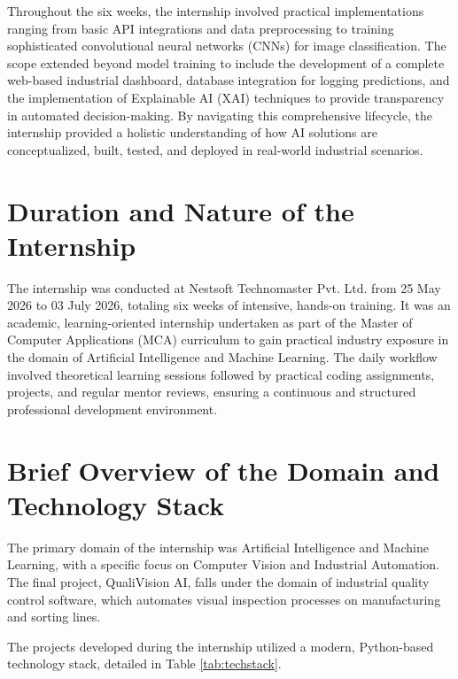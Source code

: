 Throughout the six weeks, the internship involved practical implementations ranging from basic API integrations and data preprocessing to training sophisticated convolutional neural networks (CNNs) for image classification. The scope extended beyond model training to include the development of a complete web-based industrial dashboard, database integration for logging predictions, and the implementation of Explainable AI (XAI) techniques to provide transparency in automated decision-making. By navigating this comprehensive lifecycle, the internship provided a holistic understanding of how AI solutions are conceptualized, built, tested, and deployed in real-world industrial scenarios.

\section{Duration and Nature of the Internship}

The internship was conducted at Nestsoft Technomaster Pvt. Ltd. from 25 May 2026 to 03 July 2026, totaling six weeks of intensive, hands-on training. It was an academic, learning-oriented internship undertaken as part of the Master of Computer Applications (MCA) curriculum to gain practical industry exposure in the domain of Artificial Intelligence and Machine Learning. The daily workflow involved theoretical learning sessions followed by practical coding assignments, projects, and regular mentor reviews, ensuring a continuous and structured professional development environment.

\section{Brief Overview of the Domain and Technology Stack}

The primary domain of the internship was Artificial Intelligence and Machine Learning, with a specific focus on Computer Vision and Industrial Automation. The final project, QualiVision AI, falls under the domain of industrial quality control software, which automates visual inspection processes on manufacturing and sorting lines.

The projects developed during the internship utilized a modern, Python-based technology stack, detailed in Table \ref{tab:techstack}.

